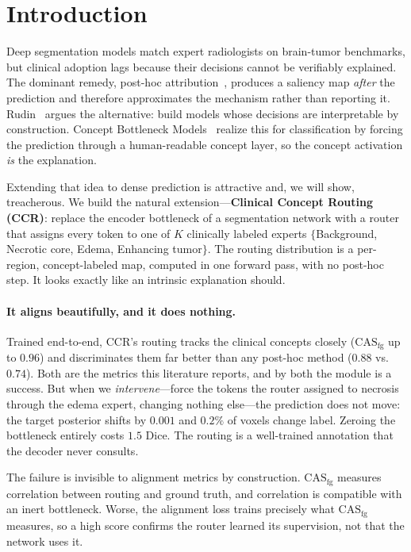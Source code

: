 \documentclass[runningheads]{llncs}
\newcommand{\casfg}{\mathrm{CAS}_{\mathrm{fg}}}
\begin{document}
\section{Introduction}
Deep segmentation models match expert radiologists on brain-tumor benchmarks, but clinical
adoption lags because their decisions cannot be verifiably explained. The dominant remedy,
post-hoc attribution~\cite{selvaraju2017gradcam,sundararajan2017ig,lundberg2017shap}, produces
a saliency map \emph{after} the prediction and therefore approximates the mechanism rather
than reporting it. Rudin~\cite{rudin2019stop} argues the alternative: build models whose
decisions are interpretable by construction. Concept Bottleneck
Models~\cite{koh2020cbm} realize this for classification by forcing the prediction through a
human-readable concept layer, so the concept activation \emph{is} the explanation.

Extending that idea to dense prediction is attractive and, we will show, treacherous. We build
the natural extension---\textbf{Clinical Concept Routing (CCR)}: replace the encoder bottleneck
of a segmentation network with a router that assigns every token to one of $K$ clinically
labeled experts $\{$Background, Necrotic core, Edema, Enhancing tumor$\}$. The routing
distribution is a per-region, concept-labeled map, computed in one forward pass, with no
post-hoc step. It looks exactly like an intrinsic explanation should.

\paragraph{It aligns beautifully, and it does nothing.}
Trained end-to-end, CCR's routing tracks the clinical concepts closely ($\casfg$ up to $0.96$)
and discriminates them far better than any post-hoc method ($0.88$ vs.\ $0.74$). Both are the
metrics this literature reports, and by both the module is a success. But when we
\emph{intervene}---force the tokens the router assigned to necrosis through the edema expert,
changing nothing else---the prediction does not move: the target posterior shifts by $0.001$
and $0.2\%$ of voxels change label. Zeroing the bottleneck entirely costs $1.5$ Dice. The
routing is a well-trained annotation that the decoder never consults.

The failure is invisible to alignment metrics by construction. $\casfg$ measures correlation
between routing and ground truth, and correlation is compatible with an inert bottleneck.
Worse, the alignment loss trains precisely what $\casfg$ measures, so a high score confirms
the router learned its supervision, not that the network uses it.
\end{document}
